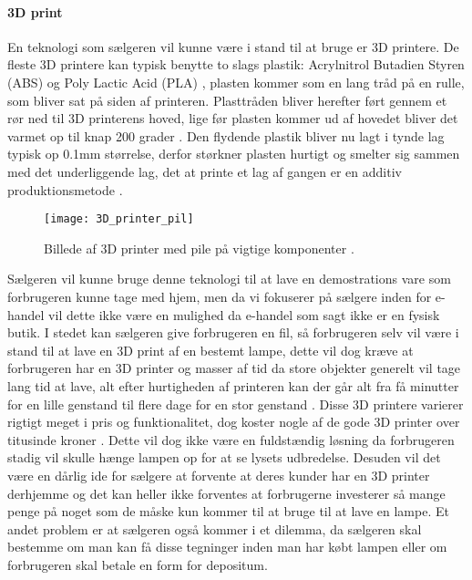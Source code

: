 \paragraph{3D print}
En teknologi som sælgeren vil kunne være i stand til at bruge er 3D printere. De fleste 3D printere kan typisk benytte to slags plastik: Acrylnitrol Butadien Styren (ABS) \cite{hvordan_3Dprinter} og Poly Lactic Acid (PLA) \cite{hvordan_3Dprinter}, plasten kommer som en lang tråd på en rulle, som bliver sat på siden af printeren. Plasttråden bliver herefter ført gennem et rør ned til 3D printerens hoved, lige før plasten kommer ud af hovedet bliver det varmet op til knap 200 grader \cite{hvordan_3Dprinter}. Den flydende plastik bliver nu lagt i tynde lag typisk op 0.1mm størrelse, derfor størkner plasten hurtigt og smelter sig sammen med det underliggende lag, det at printe et lag af gangen er en additiv produktionsmetode \cite{additiv_produktion}. 
\begin{figure}[H]
    \centering
    \texttt{[image: 3D\_printer\_pil]}
    \caption{Billede af 3D printer med pile på vigtige komponenter \cite{3D_printer_amazon}.}
\end{figure}
Sælgeren vil kunne bruge denne teknologi til at lave en demostrations vare som forbrugeren kunne tage med hjem, men da vi fokuserer på sælgere inden for e-handel vil dette ikke være en mulighed da e-handel som sagt ikke er en fysisk butik. I stedet kan sælgeren give forbrugeren en fil, så forbrugeren selv vil være i stand til at lave en 3D print af en bestemt lampe, dette vil dog kræve at forbrugeren har en 3D printer og masser af tid da store objekter generelt vil tage lang tid at lave, alt efter hurtigheden af printeren kan der går alt fra få minutter for en lille genstand til flere dage for en stor genstand \cite{hvordan_3Dprinter}. Disse 3D printere varierer rigtigt meget i pris og funktionalitet, dog koster nogle af de gode 3D printer over titusinde kroner \cite{3D_printer}. 
\newline Dette vil dog ikke være en fuldstændig løsning da forbrugeren stadig vil skulle hænge lampen op for at se lysets udbredelse. Desuden vil det være en dårlig ide for sælgere at forvente at deres kunder har en 3D printer derhjemme og det kan heller ikke forventes at forbrugerne investerer så mange penge på noget som de måske kun kommer til at bruge til at lave en lampe. Et andet problem er at sælgeren også kommer i et dilemma, da sælgeren skal bestemme om man kan få disse tegninger inden man har købt lampen eller om forbrugeren skal betale en form for depositum.

